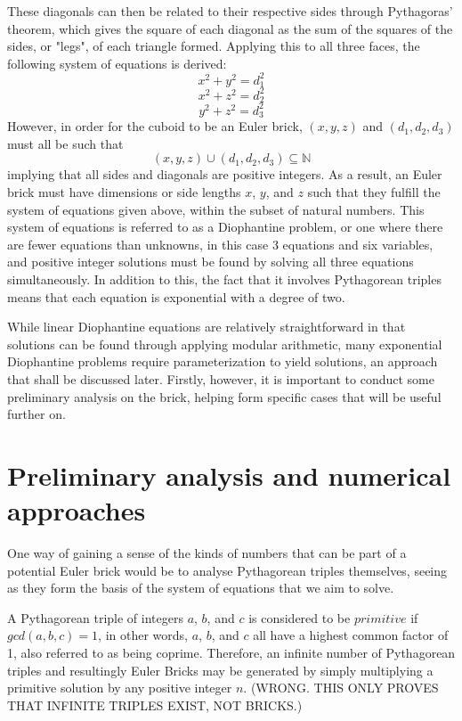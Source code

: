 \documentclass[11pt]{article}
\begin{document}
These diagonals can then be related to their respective sides through Pythagoras' theorem, which gives the square of each diagonal as the sum of the squares of the sides, or "legs", of each triangle formed. Applying this to all three faces, the following system of equations is derived:
$$x^2+y^2=d_1^2$$
$$x^2+z^2=d_2^2$$
$$y^2+z^2=d_3^2$$
However, in order for the cuboid to be an Euler brick, $(x, y, z)$ and $(d_1, d_2, d_3)$ must all be such that 
$$(x, y, z)\cup(d_1, d_2, d_3)\subseteq{\mathbb{N}}$$
implying that all sides and diagonals are positive integers.
As a result, an Euler brick must have dimensions or side lengths $x$, $y$, and $z$ such that they fulfill the system of equations given above, within the subset of natural numbers. This system of equations is referred to as a Diophantine problem, or one where there are fewer equations than unknowns, in this case 3 equations and six variables, and positive integer solutions must be found by solving all three equations simultaneously. In addition to this, the fact that it involves Pythagorean triples means that each equation is exponential with a degree of two.

While linear Diophantine equations are relatively straightforward in that solutions can be found through applying modular arithmetic, many exponential Diophantine problems require parameterization to yield solutions, an approach that shall be discussed later. Firstly, however, it is important to conduct some preliminary analysis on the brick, helping form specific cases that will be useful further on.


\section{Preliminary analysis and numerical approaches}
One way of gaining a sense of the kinds of numbers that can be part of a potential Euler brick would be to analyse Pythagorean triples themselves, seeing as they form the basis of the system of equations that we aim to solve.

A Pythagorean triple of integers $a$, $b$, and $c$ is considered to be $primitive$ if $gcd(a, b, c)=1$, in other words, $a$, $b$, and $c$ all have a highest common factor of 1, also referred to as being coprime. Therefore, an infinite number of Pythagorean triples and resultingly Euler Bricks may be generated by simply multiplying a primitive solution by any positive integer $n$. (WRONG. THIS ONLY PROVES THAT INFINITE TRIPLES EXIST, NOT BRICKS.)
\end{document}
